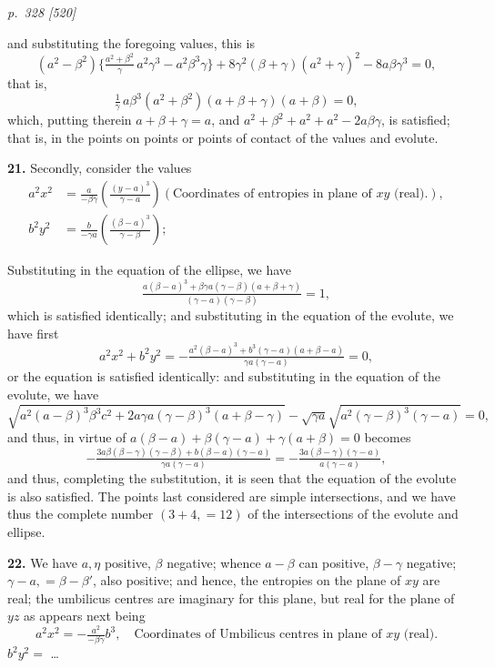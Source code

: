 \documentclass[11pt,a4paper]{article}
\theoremstyle{plain}
\theoremstyle{definition}
\begin{document}
\clearpage

\bigskip
\textit{p.~328 [520]}
\smallskip

and substituting the foregoing values, this is
\[
(a^2 - \beta^2)\{\tfrac{a^2 + \beta^2}{\gamma}\,a^2\gamma^3 - a^2 \beta^3\gamma\} + 8\gamma^2(\beta + \gamma)(a^2 + \gamma)^2 - 8a\beta\gamma^3 = 0,
\]
that is,
\[
\tfrac{1}{\gamma}\,a\beta^3(a^2 + \beta^2)(a + \beta + \gamma)(a + \beta) = 0,
\]
which, putting therein $a + \beta + \gamma = a$, and $a^2 + \beta^2 + a^2 + a^2 - 2a\beta\gamma$, is satisfied; that is, in the points on points or points of contact of the values and evolute.

\textbf{21.} Secondly, consider the values
\begin{align*}
a^2 x^2 &= \tfrac{a}{-\beta\gamma}\!\left(\tfrac{(y - a)^3}{\gamma - a}\right) (\text{Coordinates of entropies in plane of $xy$ (real).}),\\
b^2 y^2 &= \tfrac{b}{-\gamma a}\!\left(\tfrac{(\beta - a)^3}{\gamma - \beta}\right);
\end{align*}

Substituting in the equation of the ellipse, we have
\[
\tfrac{a(\beta - a)^3 + \beta\gamma a(\gamma - \beta)(a + \beta + \gamma)}{(\gamma - a)(\gamma - \beta)} = 1,
\]
which is satisfied identically; and substituting in the equation of the evolute, we have first
\[
a^2 x^2 + b^2 y^2 = -\tfrac{a^2(\beta - a)^3 + b^3(\gamma - a)(a + \beta - a)}{\gamma a(\gamma - a)} = 0,
\]
or the equation is satisfied identically: and substituting in the equation of the evolute, we have
\[
\sqrt{a^2(a - \beta)^3 \beta^3 c^2 + 2a\gamma a(\gamma - \beta)^3(a + \beta - \gamma)} - \sqrt{\gamma a}\sqrt{a^2(\gamma - \beta)^3(\gamma - a)} = 0,
\]
and thus, in virtue of $a(\beta - a) + \beta(\gamma - a) + \gamma(a + \beta) = 0$ becomes
\[
-\tfrac{3a\beta(\beta - \gamma)(\gamma - \beta) + b(\beta - a)(\gamma - a)}{\gamma a(\gamma - a)} = -\tfrac{3a(\beta - \gamma)(\gamma - a)}{a(\gamma - a)},
\]
and thus, completing the substitution, it is seen that the equation of the evolute is also satisfied. The points last considered are simple intersections, and we have thus the complete number $(3 + 4, = 12)$ of the intersections of the evolute and ellipse.

\textbf{22.} We have $a, \eta$ positive, $\beta$ negative; whence $a - \beta$ can positive, $\beta - \gamma$ negative; $\gamma - a, = \beta - \beta'$, also positive; and hence, the entropies on the plane of $xy$ are real; the umbilicus centres are imaginary for this plane, but real for the plane of $yz$ as appears next being
\[
a^2 x^2 = -\tfrac{a^2}{-\beta\gamma}b^3,\quad\text{Coordinates of Umbilicus centres in plane of $xy$ (real).}
\]
$b^2 y^2 = $ \ldots
\end{document}
